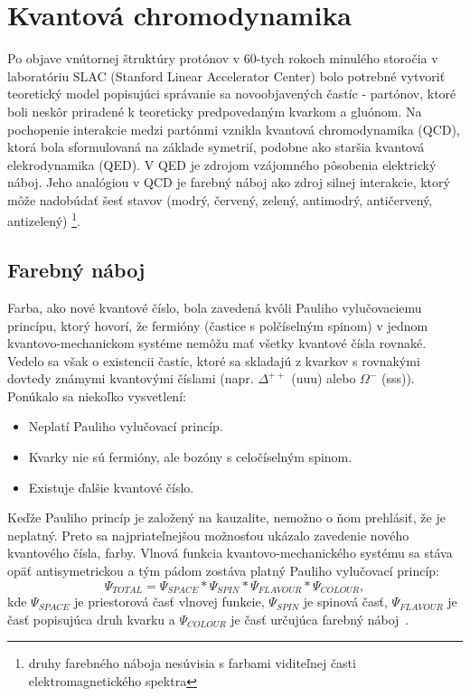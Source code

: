 \documentclass[thesismargins, thesislinespacing]{rnthesis}
\begin{document}
\chapter{Kvantová chromodynamika}

Po objave vnútornej štruktúry protónov v 60-tych rokoch minulého storočia v laboratóriu SLAC (Stanford Linear Accelerator Center) bolo potrebné vytvoriť teoretický model popisujúci správanie sa novoobjavených častíc - partónov, ktoré boli neskôr priradené k teoreticky predpovedaným kvarkom a gluónom. Na pochopenie interakcie medzi partónmi vznikla kvantová chromodynamika (QCD), ktorá bola sformulovaná na základe symetrií, podobne ako staršia kvantová elekrodynamika (QED). V QED je zdrojom vzájomného pôsobenia elektrický náboj. Jeho analógiou v QCD je farebný náboj ako zdroj silnej interakcie, ktorý môže nadobúdať šesť stavov (modrý, červený, zelený, antimodrý, antičervený, antizelený) \footnote{druhy farebného náboja nesúvisia s farbami viditeľnej časti elektromagnetického spektra}.

\section{Farebný náboj}
Farba, ako nové kvantové číslo, bola zavedená kvôli Pauliho vylučovaciemu princípu, ktorý hovorí, že fermióny (častice s polčíselným spinom) v jednom kvantovo-me\-cha\-nic\-kom systéme nemôžu mať všetky kvantové čísla rovnaké. Vedelo sa však o existencii častíc, ktoré sa skladajú z kvarkov s rovnakými dovtedy známymi kvantovými číslami (napr. $\Delta^{++}$ (uuu) alebo $\Omega^{-}$ (sss)). Ponúkalo sa niekoľko vysvetlení:
\begin{itemize}
	\item Neplatí Pauliho vylučovací princíp.
	\item Kvarky nie sú fermióny, ale bozóny s celočíselným spinom.
	\item Existuje ďalšie kvantové číslo.
\end{itemize}
Keďže Pauliho princíp je založený na kauzalite, nemožno o ňom prehlásiť, že je neplatný. Preto sa najpriateľnejšou možnosťou ukázalo zavedenie nového kvantového čísla, farby. Vlnová funkcia kvantovo-mechanického systému sa stáva opäť antisymetrickou a tým pádom zostáva platný Pauliho vylučovací princíp:
\begin{equation}
	\Psi_{TOTAL}=\Psi_{SPACE}*\Psi_{SPIN}*\Psi_{FLAVOUR}*\Psi_{COLOUR}, 
\end{equation}   
kde $\Psi_{SPACE}$ je priestorová časť vlnovej funkcie, $\Psi_{SPIN}$ je spinová časť, $\Psi_{FLAVOUR}$ je časť popisujúca druh kvarku a $\Psi_{COLOUR}$ je časť určujúca farebný náboj~\cite{1}.
\end{document}
